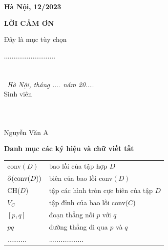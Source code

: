 \documentclass[12pt,a4paper,openany,oneside]{report}
\begin{document}
\vfill
\begin{center}
	{{\bf Hà Nội, 12/2023}}
\end{center}


\newpage
\restoregeometry
 \pagestyle{fancy}
 \fontsize{13pt}{13pt}\selectfont \baselineskip 0.75cm 

\tableofcontents

\newpage
\begin{center}
	\Large{\textbf{LỜI CẢM ƠN}}\\
\end{center}
\vspace{1cm}
Đây là mục tùy chọn

...........................
\
 \\
 
 \
  \\
 \
  \\
 
\phantom{nnnnnnnnnnnnnnnnnnnnnnnnnnnnnnn}\  {\textit{Hà Nội, tháng ....  năm 20....}} \\
\phantom{nnnnnnnnnnnnnnnnnnnnnnnnnnnnnnnnnnnnnnnnn} {Sinh viên}\\
\phantom{nnnnnnnnnnnnnnnnnnnnnnnnnnnnnnnnnn} \\
\phantom{nnnnnnnnnnnnnnnnnnnnnnnnnnnnnnnnnn} \\ 
\phantom{nnnnnnnnnnnnnnnnnnnnnnnnnnnnnnnnnn} \\ 
\phantom{nnnnnnnnnnnnnnnnnnnnnnnnnnnnnnnnnnnnnnn}   {Nguyễn Văn A}





\newpage 
{} 

\listoffigures


\newpage 
{} 
\listoftables

	\newpage
{}

\begin{center}
	{\LARGE
		{\bf Danh mục các ký hiệu và chữ viết tắt}}
\end{center}
\vspace{1.25cm}
{\fontsize{13}{13}\selectfont
	\begin{tabular}{ll}
		conv$(D)$ & bao lồi của tập hợp $D$\\
		$\partial ({\rm conv}(D))$ & biên của bao lồi conv$(D)$\\
		CH($D$) & tập các hình tròn cực biên của tập $D$\\
		$V_C$ & tập đỉnh của bao lồi conv($C$)\\
		$[p,q]$ & đoạn thẳng nối $p$ với $q$\\
		$pq$& đường thẳng đi qua $p$ và $q$\\
  .......... & ..................
	\end{tabular}
}
\end{document}
